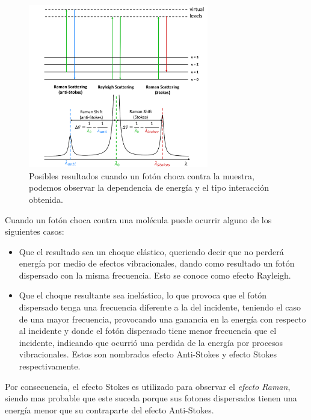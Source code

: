 \begin{figure}[h!]
    \centering
    \includegraphics[width=0.7\textwidth]{figures/chap3/raman-ray-stokes-antistokes.png}
        \caption{Posibles resultados cuando un fotón choca contra la muestra, podemos observar la 
        dependencia de energía y el tipo interacción obtenida.}
    \label{fig:raman_diagram}
\end{figure}

Cuando un fotón choca contra una molécula puede ocurrir alguno de los siguientes casos:
    \begin{itemize}
        \item Que el resultado sea un choque elástico, queriendo decir que no perderá energía por medio de
        efectos vibracionales, dando como resultado un fotón dispersado con la misma frecuencia. Esto se conoce 
        como efecto Rayleigh.

        \item Que el choque resultante sea inelástico, lo que provoca que el fotón dispersado tenga una frecuencia 
        diferente a la del incidente, teniendo el caso de una mayor frecuencia, provocando una ganancia en la energía 
        con respecto al incidente y donde el fotón dispersado tiene menor frecuencia que el incidente, indicando que 
        ocurrió una perdida de la energía por procesos vibracionales. Estos son nombrados efecto Anti-Stokes y efecto 
        Stokes respectivamente.
    \end{itemize}

Por consecuencia, el efecto Stokes es utilizado para observar el \textit{efecto Raman}, siendo mas probable que
este suceda porque sus fotones dispersados tienen una energía menor que su contraparte del efecto Anti-Stokes.

